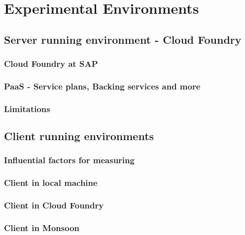 \chapter{Experimental Environments}
\section{Server running environment -  Cloud Foundry}
\subsection{Cloud Foundry at SAP}
\subsection{PaaS - Service plans, Backing services and more}
\subsection{Limitations}
\section{ Client running environments}
\subsection{Influential factors for measuring}
\subsection{Client in local machine}
\subsection{Client in Cloud Foundry}
\subsection{Client in Monsoon}


